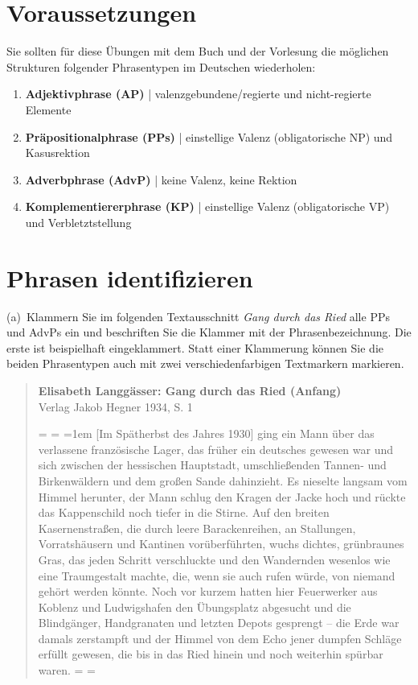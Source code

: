 \section*{Voraussetzungen}

Sie sollten für diese Übungen mit dem Buch und der Vorlesung die möglichen Strukturen folgender Phrasentypen im Deutschen wiederholen:

\begin{enumerate}\Lf
  \item \textbf{Adjektivphrase (AP)} | valenzgebundene\slash regierte und nicht-regierte Elemente
  \item \textbf{Präpositionalphrase (PPs)} | einstellige Valenz (obligatorische NP) und Kasusrektion
  \item \textbf{Adverbphrase (AdvP)} | keine Valenz, keine Rektion
  \item \textbf{Komplementiererphrase (KP)} | einstellige Valenz (obligatorische VP) und Verbletztstellung
\end{enumerate}

\section{Phrasen identifizieren}\label{sec:erkennen}

(a)~Klammern Sie im folgenden Textausschnitt \textit{Gang durch das Ried} alle PPs und AdvPs ein und beschriften Sie die Klammer mit der Phrasenbezeichnung.
Die erste ist beispielhaft eingeklammert.
Statt einer Klammerung können Sie die beiden Phrasentypen auch mit zwei verschiedenfarbigen Textmarkern markieren.

\begin{quote}\onehalfspacing
   \textbf{Elisabeth Langgässer: Gang durch das Ried (Anfang)}\\
   {\footnotesize Verlag Jakob Hegner 1934, S. 1 }

  \newdimen\origiwspc%
  \newdimen\origiwstr%
  \origiwspc=\font
  \origiwstr=\font
  \font=1em
  {[Im Spätherbst des Jahres 1930]} ging ein Mann über das verlassene französische Lager, das früher ein deutsches gewesen war und sich zwischen der hessischen Hauptstadt, umschließenden Tannen- und Birkenwäldern und dem großen Sande dahinzieht. Es nieselte langsam vom Himmel herunter, der Mann schlug den Kragen der Jacke hoch und rückte das Kappenschild noch tiefer in die Stirne. Auf den breiten Kasernenstraßen, die durch leere Barackenreihen, an Stallungen, Vorratshäusern und Kantinen vorüberführten, wuchs dichtes, grünbraunes Gras, das jeden Schritt verschluckte und den Wandernden wesenlos wie eine Traumgestalt machte, die, wenn sie auch rufen würde, von niemand gehört werden könnte. Noch vor kurzem hatten hier Feuerwerker aus Koblenz und Ludwigshafen den Übungsplatz abgesucht und die Blindgänger, Handgranaten und letzten Depots gesprengt – die Erde war damals zerstampft und der Himmel von dem Echo jener dumpfen Schläge erfüllt gewesen, die bis in das Ried hinein und noch weiterhin spürbar waren.
  \font=\origiwspc
  \font=\origiwstr
\end{quote}

